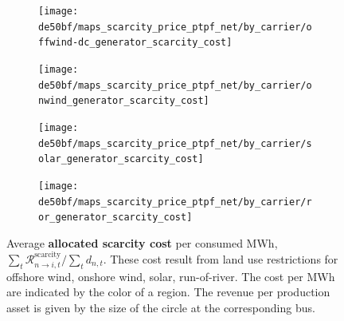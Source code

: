 \documentclass[11pt,twocolumn]{article}
\newcommand{\demand}[1][n]{d_{#1,t}}
\newcommand{\remainingcost}{\mathcal{R}}
\newcommand{\scarcitycost}{\remainingcost^\text{scarcity}}
\newcommand{\allocatescarcitycost}[1][n \rightarrow i]{\scarcitycost_{#1,t}}
\begin{document}
\begin{figure}
    \centering
    \begin{subfigure}[c]{.49\linewidth}
        \texttt{[image: de50bf/maps\_scarcity\_price\_ptpf\_net/by\_carrier/offwind-dc\_generator\_scarcity\_cost]}
        \label{fig:offwind-dc_generator_scarcity_cost}
    \end{subfigure}
    \begin{subfigure}[c]{.49\linewidth}
        \texttt{[image: de50bf/maps\_scarcity\_price\_ptpf\_net/by\_carrier/onwind\_generator\_scarcity\_cost]}
        \label{fig:onwind_generator_scarcity_cost}
    \end{subfigure}
    \begin{subfigure}[c]{.49\linewidth}
        \texttt{[image: de50bf/maps\_scarcity\_price\_ptpf\_net/by\_carrier/solar\_generator\_scarcity\_cost]}
        \label{fig:solar_generator_scarcity_cost}
    \end{subfigure}
    \begin{subfigure}[c]{.49\linewidth}
        \texttt{[image: de50bf/maps\_scarcity\_price\_ptpf\_net/by\_carrier/ror\_generator\_scarcity\_cost]}
        \label{fig:ror_generator_scarcity_cost}
    \end{subfigure}
    \caption{Average \textbf{allocated scarcity cost} per consumed MWh, $\sum_t \allocatescarcitycost / \sum_t \demand$. These cost result from land use restrictions for offshore wind, onshore wind,  solar, run-of-river. The cost per MWh are indicated by the color of a region. The revenue per production asset is given by the size of the circle at the corresponding bus.}
    \label{fig:scarcity_price}
\end{figure}





\clearpage
\printbibliography
\end{document}
